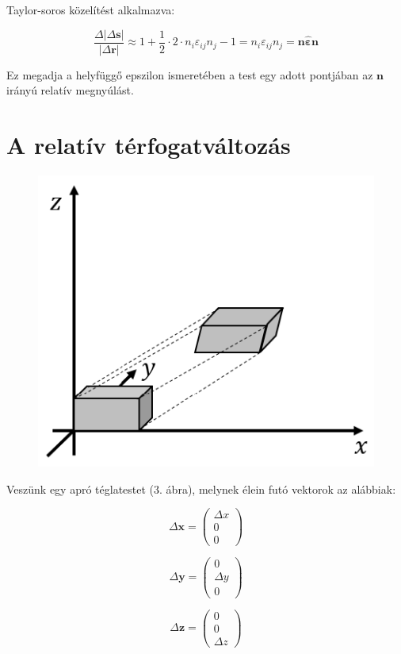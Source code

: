 \documentclass[a4paper, 12pt]{article}
\begin{document}
Taylor-soros közelítést alkalmazva:

$$\frac{\Delta|\Delta\mathbf{s}|}{|\Delta\mathbf{r}|}\approx 1+\frac12\cdot 2\cdot n_i\varepsilon_{ij}n_j-1=n_i\varepsilon_{ij}n_j=\mathbf{n}\mathbf{\hat\varepsilon}\mathbf{n}$$

Ez megadja a helyfüggő epszilon ismeretében a test egy adott pontjában az $\mathbf{n}$ irányú relatív megnyúlást.


\part*{\Large{A relatív térfogatváltozás}}

\begin{figure}[h]
\centering
\includegraphics[scale=0.6]{tetel2_3.png}
\caption{}
\end{figure}

Veszünk egy apró téglatestet (3. ábra), melynek élein futó vektorok az alábbiak:

$$\Delta\mathbf{x}= \left( \begin{array}{c} \Delta x\\0\\0\end{array}\right)$$

$$\Delta\mathbf{y}= \left( \begin{array}{c} 0\\ \Delta y\\0\end{array}\right)$$

$$\Delta\mathbf{z}= \left( \begin{array}{c} 0\\0\\\Delta z\end{array}\right)$$
\end{document}
